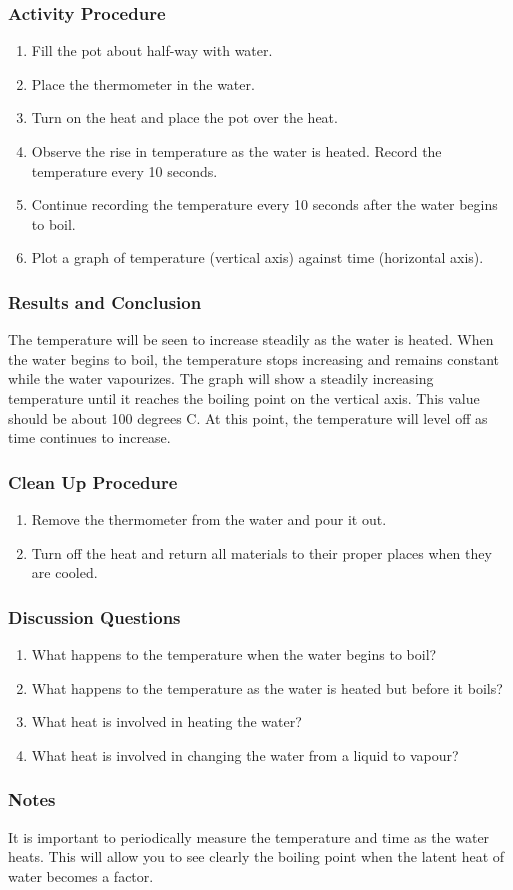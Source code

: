\subsubsection*{Activity Procedure}
\begin{enumerate}
\item{Fill the pot about half-way with water.} 
\item{Place the thermometer in the water.} 
\item{Turn on the heat and place the pot over the heat.} 
\item{Observe the rise in temperature as the water is heated. Record the temperature every 10 seconds.} 
\item{Continue recording the temperature every 10 seconds after the water begins to boil.} 
\item{Plot a graph of temperature (vertical axis) against time (horizontal axis).} 
\end{enumerate}

\subsubsection*{Results and Conclusion}
The temperature will be seen to increase steadily as the water is heated. When the water begins to boil, the temperature stops increasing and remains constant while the water vapourizes. The graph will show a steadily increasing temperature until it reaches the boiling point on the vertical axis. This value should be about 100 degrees C. At this point, the temperature will level off as time continues to increase.  

\subsubsection*{Clean Up Procedure}
\begin{enumerate}
\item{Remove the thermometer from the water and pour it out.} 
\item{Turn off the heat and return all materials to their proper places when they are cooled.} 
\end{enumerate}

\subsubsection*{Discussion Questions}
\begin{enumerate}
\item{What happens to the temperature when the water begins to boil?}
\item{What happens to the temperature as the water is heated but before it boils?}
\item{What heat is involved in heating the water?}
\item{What heat is involved in changing the water from a liquid to vapour?}
\end{enumerate}

\subsubsection*{Notes}
It is important to periodically measure the temperature and time as the water heats.  This will allow you to see clearly the boiling point when the latent heat of water becomes a factor.

